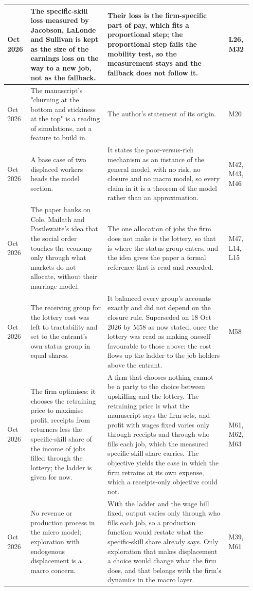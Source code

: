 \documentclass[10pt]{article}
\begin{document}
{\begin{longtable}{>{\raggedright\arraybackslash}p{2.0cm} >{\raggedright\arraybackslash}p{8.0cm} >{\raggedright\arraybackslash}p{10.0cm} >{\raggedright\arraybackslash}p{3.0cm}}
15 Oct 2026 & The specific-skill loss measured by Jacobson, LaLonde and Sullivan is kept as the size of the earnings loss on the way to a new job, not as the fallback. & Their loss is the firm-specific part of pay, which fits a proportional step; the proportional step fails the mobility test, so the measurement stays and the fallback does not follow it. & L26, M32 \\ \midrule
15 Oct 2026 & The manuscript's "churning at the bottom and stickiness at the top" is a reading of simulations, not a feature to build in. & The author's statement of its origin. & M20 \\ \midrule
15 Oct 2026 & A base case of two displaced workers heads the model section. & It states the poor-versus-rich mechanism as an instance of the general model, with no risk, no closure and no macro model, so every claim in it is a theorem of the model rather than an approximation. & M42, M43, M46 \\ \midrule
16 Oct 2026 & The paper banks on Cole, Mailath and Postlewaite's idea that the social order touches the economy only through what markets do not allocate, without their marriage model. & The one allocation of jobs the firm does not make is the lottery, so that is where the status group enters, and the idea gives the paper a formal reference that is read and recorded. & M47, L14, L15 \\ \midrule
17 Oct 2026 & The receiving group for the lottery cost was left to tractability and set to the entrant's own status group in equal shares. & It balanced every group's accounts exactly and did not depend on the closure rule. Superseded on 18 Oct 2026 by M58 as now stated, once the lottery was read as making oneself favourable to those above: the cost flows up the ladder to the job holders above the entrant. & M58 \\ \midrule
19 Oct 2026 & The firm optimises: it chooses the retraining price to maximise profit, receipts from returners less the specific-skill share of the income of jobs filled through the lottery; the ladder is given for now. & A firm that chooses nothing cannot be a party to the choice between upskilling and the lottery. The retraining price is what the manuscript says the firm sets, and profit with wages fixed varies only through receipts and through who fills each job, which the measured specific-skill share carries. The objective yields the case in which the firm retrains at its own expense, which a receipts-only objective could not. & M61, M62, M63 \\ \midrule
19 Oct 2026 & No revenue or production process in the micro model; exploration with endogenous displacement is a macro concern. & With the ladder and the wage bill fixed, output varies only through who fills each job, so a production function would restate what the specific-skill share already says. Only exploration that makes displacement a choice would change what the firm does, and that belongs with the firm's dynamics in the macro layer. & M39, M61 \\ \midrule
\end{longtable}}
\end{document}
